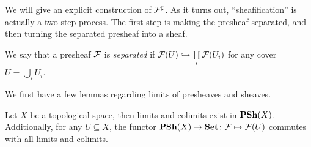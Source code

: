 \documentclass{article}
\begin{document}
We will give an explicit construction of $\mathcal{F}^\sharp$.
As it turns out, ``sheafification'' is actually a two-step process.
The first step is making the presheaf separated, and then turning
the separated presheaf into a sheaf.
\begin{definition}
    We say that a presheaf $\mathcal{F}$ is \emph{separated} if $\mathcal{F}(U) \hookrightarrow \prod\limits_i \mathcal{F}(U_i)$
    for any cover $U = \bigcup_i U_i$.
\end{definition}
We first have a few lemmas regarding limits of presheaves and sheaves.
\begin{lemma}
    Let $X$ be a topological space, then limits and
    colimits exist in $\operatorname{\mathbf{PSh}}(X)$. Additionally, for any $U\subseteq X$,
    the functor $\operatorname{\mathbf{PSh}}(X) \to \operatorname{\mathbf{Set}} \colon \mathcal{F} \mapsto \mathcal{F}(U)$
    commutes with all limits and colimits.
\end{lemma}
\end{document}
